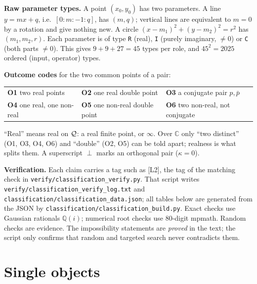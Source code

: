 \documentclass[11pt]{article}
\theoremstyle{definition}\newtheorem{definition}[theorem]{Definition}\newtheorem{remark}[theorem]{Remark}\newtheorem{example}[theorem]{Example}
\newcommand{\C}{\mathbb{C}}\newcommand{\R}{\mathbb{R}}\newcommand{\PP}{\mathbb{P}}
\begin{document}
\textbf{Raw parameter types.} A point $(x_0,y_0)$ has two parameters. A line $y=mx+q$, i.e.\ $[0:m:-1:q]$, has $(m,q)$; vertical lines are equivalent to $m=0$ by a rotation and give nothing new. A circle $(x-m_1)^2+(y-m_2)^2=r^2$ has $(m_1,m_2,r)$. Each parameter is of type \texttt{R} (real), \texttt{I} (purely imaginary, $\neq0$) or \texttt{C} (both parts $\neq0$). This gives $9+9+27=45$ types per role, and $45^2=2025$ ordered (input, operator) types.

\textbf{Outcome codes} for the two common points of a pair:
\begin{center}\small\begin{tabular}{lll}\toprule
\textbf{O1} two real points & \textbf{O2} one real double point & \textbf{O3} a conjugate pair $p,\bar p$\\
\textbf{O4} one real, one non-real & \textbf{O5} one non-real double point & \textbf{O6} two non-real, not conjugate\\\bottomrule\end{tabular}\end{center}
``Real'' means real on $\mathcal{Q}$: a real finite point, or $\infty$. Over $\C$ only ``two distinct'' (O1, O3, O4, O6) and ``double'' (O2, O5) can be told apart; realness is what splits them. A superscript $\perp$ marks an orthogonal pair ($\kappa=0$).

\textbf{Verification.} Each claim carries a tag such as \textsf{[L2]}, the tag of the matching check in \texttt{verify/classification\_verify.py}. That script writes \texttt{verify/classification\_verify\_log.txt} and \texttt{classification/classification\_data.json}; all tables below are generated from the JSON by \texttt{classification/classification\_build.py}. Exact checks use Gaussian rationals $\mathbb{Q}(i)$; numerical root checks use 80-digit mpmath. Random checks are evidence. The impossibility statements are \emph{proved} in the text; the script only confirms that random and targeted search never contradicts them.

\section{Single objects}\label{sec:single}
\end{document}
